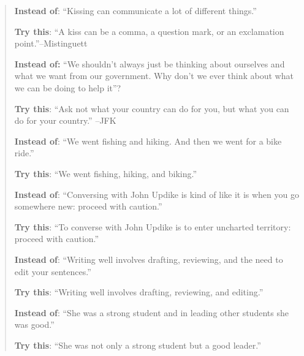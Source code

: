 \begin{quote}
\textbf{Instead of}: ``Kissing can communicate a lot of different things.''

\textbf{ Try this}: ``A kiss can be a comma, a question mark, or an exclamation 
                   point.''--Mistinguett

\textbf{Instead of:} ``We shouldn't always just be thinking about ourselves and what we want from our
                  	government. Why don't we ever think about what we can be doing to help it''?

  \textbf{	Try this}: ``Ask not what your country can do for you, but what you can do for your
                               country.'' --JFK

\textbf{Instead of}: ``We went fishing and hiking. And then we went for a bike ride.''

\textbf{	Try this}: ``We went fishing, hiking, and biking.''

\textbf{Instead of}: ``Conversing with John Updike is kind of like it is when you go somewhere new:
                    proceed with caution.''

	\textbf{Try this}: ``To converse with John Updike is to enter uncharted territory: proceed with
                              caution.''

\textbf{Instead of}:  ``Writing well involves drafting, reviewing, and the need to edit your sentences.''
 
	\textbf{Try this}: ``Writing well involves drafting, reviewing, and editing.''

\textbf{Instead of}: ``She was a strong student and in leading other students she was good.''

\textbf{Try this}: ``She was not only a strong student but a good leader.''
 \end{quote}
 
